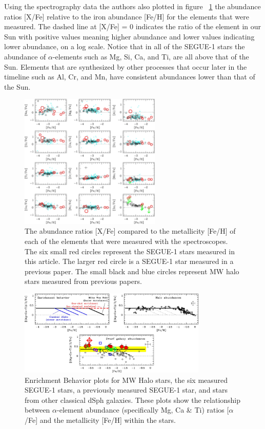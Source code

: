 \documentclass{aastex631}
\begin{document}
Using the spectrography data the authors also plotted in figure ~\ref{fig:elements} the abundance ratios [X/Fe] relative to the iron abundance [Fe/H] for the elements
that were measured. The dashed line at [X/Fe] = 0 indicates the ratio of the element in our Sun with positive values meaning higher
abundance and lower values indicating lower abundance, on a log scale. Notice that in all of the SEGUE-1 stars the abundance of
$\alpha$-elements such as Mg, Si, Ca, and Ti, are all above that of the Sun. Elements that are synthesized by other processes that
occur later in the timeline such as Al, Cr, and Mn, have consistent abundances lower than that of the Sun.

\begin{figure}[!h]
    \centering
    \includegraphics[width=0.6\textwidth]{elements.jpg}
    \caption{The abundance ratios [X/Fe] compared to the metallicity [Fe/H] of each of the elements that were measured with
    the spectroscopes. The six small red circles represent the SEGUE-1 stars measured in this article. The larger red circle
    is a SEGUE-1 star measured in a previous paper. The small black and blue circles represent MW halo stars measured from
    previous papers.}
    \label{fig:elements}
\end{figure}
\begin{figure}[!ht]
    \centering
    \includegraphics[width=0.8\textwidth]{enrich.jpg}
    \caption{Enrichment Behavior plots for MW Halo stars, the six measured SEGUE-1 stars, a previously measured SEGUE-1 star,
    and stars from other classical dSph galaxies. These plots show the relationship between $\alpha$-element abundance (specifically
    Mg, Ca \& Ti) ratios [$\alpha$/Fe] and the metallicity [Fe/H] within the stars.}
    \label{fig:enrich}
\end{figure}
\end{document}

